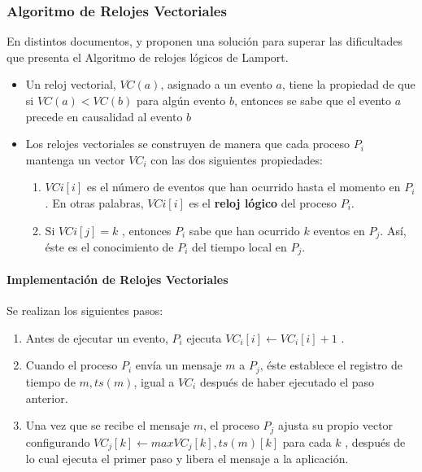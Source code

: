 			\subsubsection{Algoritmo  de Relojes Vectoriales}	
			 
		 En distintos documentos,  y  proponen  una solución para superar las dificultades que presenta el Algoritmo de relojes l\'ogicos de Lamport. 

		\begin{itemize} 
			\item  Un reloj vectorial, $VC(a)$, asignado a un evento $a$, tiene la propiedad de que si $ VC(a) < VC(b) $ para algún evento $ b$, entonces se sabe que el evento $a$ precede en causalidad al evento $b$
			\item  Los relojes vectoriales se construyen de manera que cada proceso  $P_{i}$ mantenga un vector $VC_{i}$ con las dos siguientes propiedades:
			
				\begin{enumerate}
					\item  $VCi[i]$ es el número de eventos que han ocurrido hasta el momento en $P_{i}$. En otras palabras, $	VCi[i] $ es el \textbf{reloj lógico} del proceso $P_{i}$.
					\item  Si $VCi[j] =  k$ , entonces $P_{i}$ sabe que han ocurrido $ k$ eventos en $P_{j}$. Así, éste es el conocimiento
					de $P_{i}$ del tiempo local en $P_{j}$.
				\end{enumerate}
		\end{itemize}		
				
		\paragraph{Implementaci\'on de 	Relojes Vectoriales}		
			 
		Se realizan los siguientes pasos:
					
	\begin{enumerate} 
		\item  Antes de ejecutar un evento,  $P_{i}$  ejecuta $VC_{i}[i] \leftarrow VC_{i}[i] + 1 $ .
		\item Cuando el proceso $P_{i}$ envía un mensaje $m$ a $P_{j}$, éste establece el registro de tiempo de
		$m, ts(m)$, igual a $VC_{i}$ después de haber ejecutado el paso anterior.
		\item Una vez que se recibe el mensaje $m$, el proceso $P_{j}$ ajusta su propio vector configurando
		$VC_{j}[k] \leftarrow max{VC_{j}[k],ts(m)[k]} $ para cada $k$ , después de lo cual ejecuta el primer 	paso y libera el mensaje a la aplicación.
	\end{enumerate}		
			 
